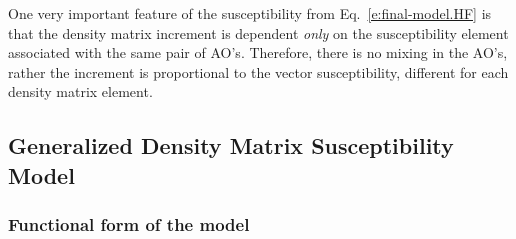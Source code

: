 \documentclass[aip,amsmath,amssymb,reprint,floatfix]{revtex4-1}
\begin{document}
One very important feature of the susceptibility from Eq.~\eqref{e:final-model.HF} is that
the density matrix increment is dependent \emph{only} on the susceptibility element associated with the same
pair of AO's. Therefore, there is no mixing in the AO's, rather the increment is proportional to the 
vector susceptibility, different for each density matrix element.

\subsection{Generalized Density Matrix Susceptibility Model}

\subsubsection{Functional form of the model}
\end{document}
